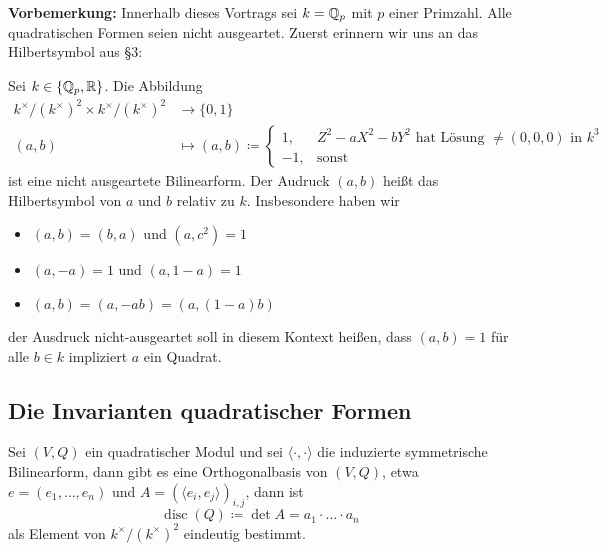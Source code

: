 \textbf{Vorbemerkung:} Innerhalb dieses Vortrags sei $k=\mathbb{Q}_p$ mit $p$ einer Primzahl. Alle quadratischen Formen 
seien nicht ausgeartet. Zuerst erinnern wir uns an das Hilbertsymbol aus §3:
\begin{remind}[Hilbertsymbol]
    Sei $k\in\{\mathbb{Q}_p,\mathbb{R}\}$. Die Abbildung 
    \begin{align*}
        k^\times/(k^\times)^2\times k^\times/(k^\times)^2&\to \{0,1\} \\  (a,b) &\mapsto (a,b) \coloneqq 
        \begin{cases}
            1, & Z^2-aX^2-bY^2 \text{ hat Lösung } \neq (0,0,0)\text{ in } k^3  \\ 
            -1, & \text{sonst}
        \end{cases}
    \end{align*}
    ist eine nicht ausgeartete Bilinearform. Der Audruck $(a,b)$ heißt das \textrm{Hilbertsymbol} von $a$ und $b$ relativ zu $k$. Insbesondere haben wir 
    \begin{itemize}
        \item $(a,b)=(b,a)$ und $(a,c^2)=1$
        \item $(a,-a)=1$ und $(a,1-a)=1$
        \item $(a,b)=(a,-ab)=(a,(1-a)b)$
    \end{itemize}
    der Ausdruck \glqq nicht-ausgeartet\grqq{} soll in diesem Kontext heißen, dass $(a,b)=1$ für alle $b\in k$ impliziert $a$ ein Quadrat. 
\end{remind}
\subsection*{Die Invarianten quadratischer Formen}
Sei $(V,Q)$ ein quadratischer Modul und sei $\langle \cdot,\cdot\rangle$ die induzierte symmetrische Bilinearform, dann gibt es eine Orthogonalbasis von
$(V,Q)$, etwa $e=(e_1,\ldots,e_n)$ und $A=(\langle e_i,e_j\rangle)_{i,j}$, dann ist
\[
\operatorname{disc}(Q) \coloneqq \det A = a_1\cdot\ldots\cdot a_n     
\]
als Element von $k^\times/(k^\times)^2$ eindeutig bestimmt. 